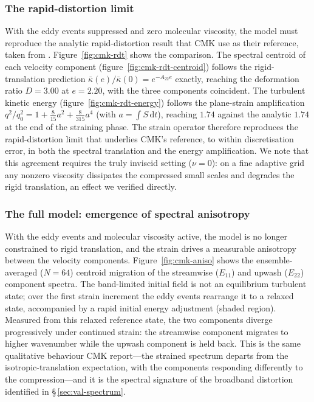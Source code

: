 \documentclass[lineno]{JFM-FLM_Au}
\begin{document}
\subsubsection{The rapid-distortion limit}\label{sec:cmk-rdt} With the eddy events suppressed and zero molecular viscosity, the model must reproduce the analytic rapid-distortion result that CMK use as their reference,
taken from \citet{LeePiomelliReynolds1986}. Figure~\ref{fig:cmk-rdt} shows the
comparison. The spectral centroid of each velocity component
(figure~\ref{fig:cmk-rdt-centroid}) follows the rigid-translation prediction
$\bar\kappa(e)/\bar\kappa(0)=e^{-A_{22}e}$ exactly, reaching the deformation
ratio $D=3.00$ at $e=2.20$, with the three components coincident. The turbulent
kinetic energy (figure~\ref{fig:cmk-rdt-energy}) follows the
\citet{LeePiomelliReynolds1986} plane-strain amplification
$q^2/q_0^2 = 1 + \tfrac{8}{15}a^2 + \tfrac{8}{315}a^4$ (with $a=\int S\,\mathrm
{d}t$), reaching $1.74$ against the analytic $1.74$ at the end of the straining
phase. The strain operator therefore reproduces the rapid-distortion limit that
underlies CMK's reference, to within discretisation error, in both the spectral
translation and the energy amplification. We note that this agreement requires
the truly inviscid setting ($\nu=0$): on a fine adaptive grid any nonzero
viscosity dissipates the compressed small scales and degrades the rigid
translation, an effect we verified directly.

\subsubsection{The full model: emergence of spectral
anisotropy}\label{sec:cmk-full}

With the eddy events and molecular viscosity active, the model is no longer
constrained to rigid translation, and the strain drives a measurable anisotropy
between the velocity components. Figure~\ref{fig:cmk-aniso} shows the
ensemble-averaged ($N=64$) centroid migration of the streamwise ($E_{11}$) and
upwash ($E_{22}$) component spectra. The band-limited initial field is not an
equilibrium turbulent state; over the first strain increment the eddy events
rearrange it to a relaxed state, accompanied by a rapid initial energy
adjustment (shaded region). Measured from this relaxed reference state, the two
components diverge progressively under continued strain: the streamwise
component migrates to higher wavenumber while the upwash component is held back.
This is the same qualitative behaviour CMK report---the strained spectrum
departs from the isotropic-translation expectation, with the components
responding differently to the compression---and it is the spectral signature of
the broadband distortion identified in \S\,\ref{sec:val-spectrum}.
\end{document}
